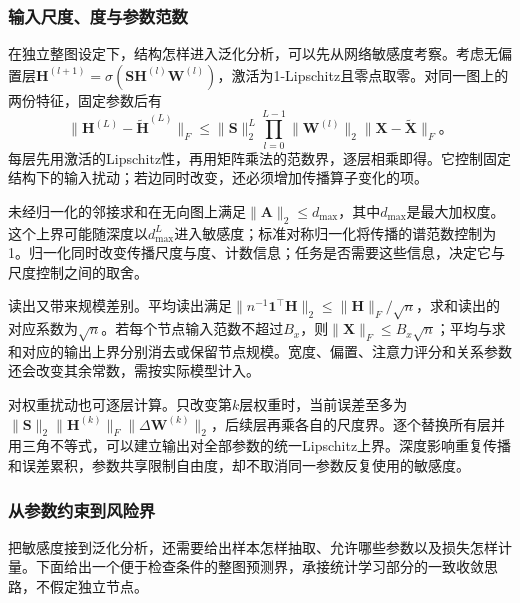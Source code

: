 \subsubsection{输入尺度、度与参数范数}
\label{sec:gnn-norm-generalization}

在独立整图设定下，结构怎样进入泛化分析，可以先从网络敏感度考察。考虑无偏置层$\bm{H}^{(l+1)}=\sigma(\bm{S}\bm{H}^{(l)}\bm{W}^{(l)})$，激活为1-Lipschitz且零点取零。对同一图上的两份特征，固定参数后有
\begin{equation}
  \lVert\bm{H}^{(L)}-\widetilde{\bm{H}}^{(L)}\rVert_F
    \leq\lVert\bm{S}\rVert_2^L
      \prod_{l=0}^{L-1}\lVert\bm{W}^{(l)}\rVert_2
      \lVert\bm{X}-\widetilde{\bm{X}}\rVert_F\text{。}
  \label{eq:gnn-feature-sensitivity}
\end{equation}
每层先用激活的Lipschitz性，再用矩阵乘法的范数界，逐层相乘即得。它控制固定结构下的输入扰动；若边同时改变，还必须增加传播算子变化的项。

未经归一化的邻接求和在无向图上满足$\lVert\bm{A}\rVert_2\leq d_{\max}$，其中$d_{\max}$是最大加权度。这个上界可能随深度以$d_{\max}^L$进入敏感度；标准对称归一化将传播的谱范数控制为1。归一化同时改变传播尺度与度、计数信息；任务是否需要这些信息，决定它与尺度控制之间的取舍。

读出又带来规模差别。平均读出满足$\lVert n^{-1}\bm{1}^{\top}\bm{H}\rVert_2\leq\lVert\bm{H}\rVert_F/\sqrt n$，求和读出的对应系数为$\sqrt n$。若每个节点输入范数不超过$B_x$，则$\lVert\bm{X}\rVert_F\leq B_x\sqrt n$；平均与求和对应的输出上界分别消去或保留节点规模。宽度、偏置、注意力评分和关系参数还会改变其余常数，需按实际模型计入。

对权重扰动也可逐层计算。只改变第$k$层权重时，当前误差至多为$\lVert\bm{S}\rVert_2\lVert\bm{H}^{(k)}\rVert_F\lVert\Delta\bm{W}^{(k)}\rVert_2$，后续层再乘各自的尺度界。逐个替换所有层并用三角不等式，可以建立输出对全部参数的统一Lipschitz上界。深度影响重复传播和误差累积，参数共享限制自由度，却不取消同一参数反复使用的敏感度。

\subsubsection{从参数约束到风险界}
\label{sec:gnn-risk-bound}

把敏感度接到泛化分析，还需要给出样本怎样抽取、允许哪些参数以及损失怎样计量。下面给出一个便于检查条件的整图预测界，承接统计学习部分的一致收敛思路，不假定独立节点。

